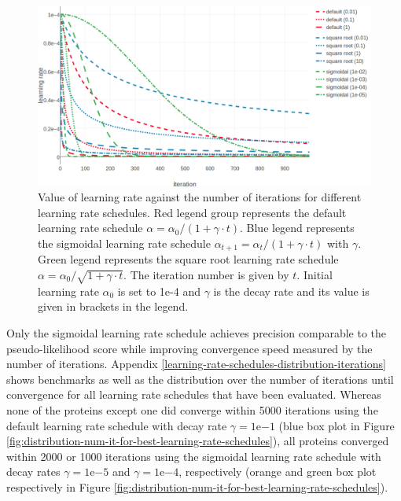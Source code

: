 \documentclass[12pt,a4paper,twoside]{book}
\theoremstyle{definition}
\theoremstyle{definition}
\theoremstyle{remark}
\begin{document}
\begin{figure}

{\centering \includegraphics[width=0.9\linewidth]{img/full_likelihood/learning_rate_schedules_alpha0_00001_notitle} 

}

\caption{Value of learning rate against the
number of iterations for different learning rate schedules. Red legend
group represents the default learning rate schedule
\(\alpha = \alpha_0 / (1 + \gamma \cdot t)\). Blue legend represents the
sigmoidal learning rate schedule
\(\alpha_{t+1} = \alpha_{t} / (1 + \gamma \cdot t)\) with \(\gamma\).
Green legend represents the square root learning rate schedule
\(\alpha = \alpha_0 / \sqrt{1 + \gamma \cdot t}\). The iteration number
is given by \(t\). Initial learning rate \(\alpha_0\) is set to 1e-4 and
\(\gamma\) is the decay rate and its value is given in brackets in the
legend.}\label{fig:learning-rate-schedules}
\end{figure}

Only the sigmoidal learning rate schedule achieves precision comparable
to the pseudo-likelihood score while improving convergence speed
measured by the number of iterations. Appendix
\ref{learning-rate-schedules-distribution-iterations} shows benchmarks
as well as the distribution over the number of iterations until
convergence for all learning rate schedules that have been evaluated.
Whereas none of the proteins except one did converge within 5000
iterations using the default learning rate schedule with decay rate
\(\gamma = 1\mathrm{e}{-1}\) (blue box plot in Figure
\ref{fig:distribution-num-it-for-best-learning-rate-schedules}), all
proteins converged within 2000 or 1000 iterations using the sigmoidal
learning rate schedule with decay rates \(\gamma = 1\mathrm{e}{-5}\) and
\(\gamma = 1\mathrm{e}{-4}\), respectively (orange and green box plot
respectively in Figure
\ref{fig:distribution-num-it-for-best-learning-rate-schedules}).
\end{document}
